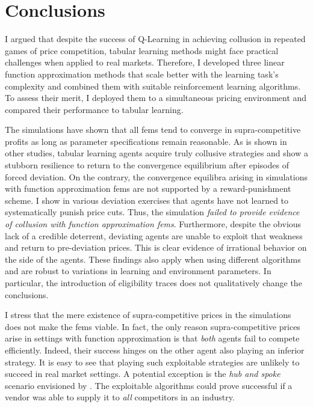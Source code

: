 \section{Conclusions}\label{conclusions}

I argued that despite the success of Q-Learning in achieving collusion in repeated games of price competition, tabular learning methods might face practical challenges when applied to real markets. Therefore, I developed three linear function approximation methods that scale better with the learning task's complexity and combined them with suitable reinforcement learning algorithms. To assess their merit, I deployed them to a simultaneous pricing environment and compared their performance to tabular learning.

The simulations have shown that all \gls{fem}s tend to converge in supra-competitive profits as long as parameter specifications remain reasonable.  As is shown in other studies, tabular learning agents acquire truly collusive strategies and show a stubborn resilience to return to the convergence equilibrium after episodes of forced deviation. On the contrary, the convergence equilibra arising in simulations with function approximation \gls{fem}s are not supported by a reward-punishment scheme. I show in various deviation exercises that agents have not learned to systematically punish price cuts. Thus, the simulation \emph{failed to provide evidence of collusion with function approximation \gls{fem}s}. Furthermore, despite the obvious lack of a credible deterrent, deviating agents are unable to exploit that weakness and return to pre-deviation prices. This is clear evidence of irrational behavior on the side of the agents. These findings also apply when using different algorithms and are robust to variations in learning and environment parameters. In particular, the introduction of eligibility traces does not qualitatively change the conclusions.

I stress that the mere existence of supra-competitive prices in the simulations does not make the \gls{fem}s viable. In fact, the only reason supra-competitive prices arise in settings with function approximation is that \emph{both} agents fail to compete efficiently. Indeed, their success hinges on the other agent also playing an inferior strategy. It is easy to see that playing such exploitable strategies are unlikely to succeed in real market settings. A potential exception is the \emph{hub and spoke} scenario envisioned by \textcite{ezrachi_algorithmic_2017}. The exploitable algorithms could prove successful if a vendor was able to supply it to \emph{all} competitors in an industry.

